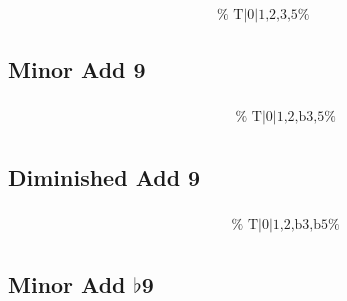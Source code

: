 \documentclass[english]{./gbook}
\begin{document}
\begin{large}
\[\begin{array}{ll}
&
	\text{
	}
\end{array}
\]

\subsection*{Minor Add 9}

\[
\begin{array}{ll}
	\begin{array}{c}
		\begin{array}{ccc}
			&%
			&%
		\end{array}
		\\
		\begin{array}{cc}
			&%
		\end{array}
	\end{array}

&
	\text{
	}
\end{array}
\]


\subsection*{Diminished Add 9}

\[
\begin{array}{ll}
	\begin{array}{c}
		\begin{array}{ccc}
			&%
			&%
		\end{array}
		\\
		\begin{array}{cc}
			&%
		\end{array}
	\end{array}

&
	\text{
	}
\end{array}
\]

\subsection*{Minor Add $\flat$9}

\[
\begin{array}{ll}
	\begin{array}{c}
		\begin{array}{ccc}
			&%
			&%
		\end{array}
		\\
		\begin{array}{cc}
			&%
		\end{array}
	\end{array}


\end{array}\]
\end{large}
\end{document}
